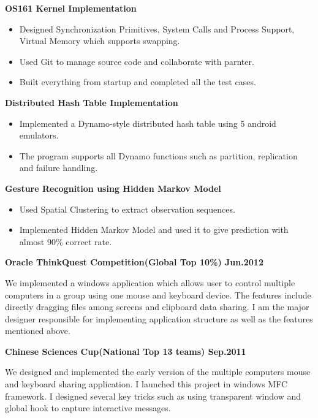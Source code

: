 \documentclass{myres}
\begin{document}
{
	\textbf{OS161 Kernel Implementation}
	\par
	\begin{itemize}[topsep=0pt, leftmargin=0.2in] \itemsep -5pt
		\item Designed Synchronization Primitives, System Calls and Process Support, Virtual Memory
			which supports swapping.
		\item Used Git to manage source code and collaborate with parnter.
		\item Built everything from startup and completed all the test cases. 
	\end{itemize}
	\par
	\smallskip
	\textbf{Distributed Hash Table Implementation}
	\par
	\begin{itemize}[topsep=0pt, leftmargin=0.2in] \itemsep -5pt
			\item Implemented a Dynamo-style distributed hash table using 5 android emulators.
			\item The program supports all Dynamo functions such as partition, replication and failure handling.
	\end{itemize}
	\par
	\smallskip
	\textbf{Gesture Recognition using Hidden Markov Model}
	\par
	\begin{itemize}[topsep=0pt, leftmargin=0.2in] \itemsep -5pt
			\item Used Spatial Clustering to extract observation sequences.
			\item Implemented Hidden Markov Model and used it to give prediction with almost 90\% correct rate.
	\end{itemize}	
}
{
	\textbf{Oracle ThinkQuest Competition(Global Top 10\%) \hfill  Jun.2012}
	\par
	We implemented a windows application which allows user to control multiple
	computers in a group using one mouse and keyboard device. The features
	include directly dragging files among screens and clipboard data sharing. I am the
	major designer responsible for implementing application structure as well as the
	features mentioned above.
	\par
	\smallskip
 	\textbf{Chinese Sciences Cup(National Top 13 teams) \hfill Sep.2011}
	\par
	We designed and implemented the early version of the multiple computers mouse
	and keyboard sharing application. I launched this project in windows
	MFC framework. I designed several key tricks such as using transparent window
	and global hook to capture interactive messages.
}
\end{document}
